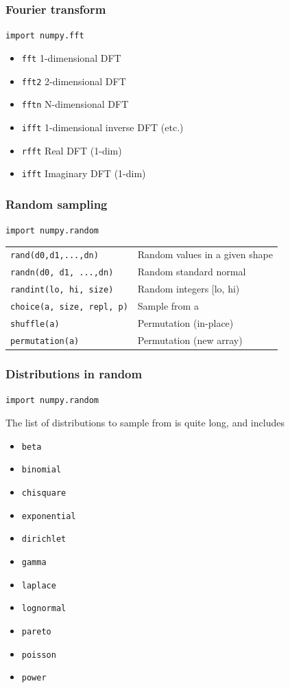 \begin{frame}\frametitle{Fourier transform}

\texttt{import numpy.fft}

\begin{itemize}
    \item \texttt{fft} 1-dimensional DFT
    \item \texttt{fft2} 2-dimensional DFT
    \item \texttt{fftn} N-dimensional DFT
    \item \texttt{ifft} 1-dimensional inverse DFT (etc.)
    \item \texttt{rfft} Real DFT (1-dim)
    \item \texttt{ifft} Imaginary DFT (1-dim)
\end{itemize}

\end{frame}

\begin{frame}\frametitle{Random sampling}

\texttt{import numpy.random}

\begin{table}
\centering
\begin{tabular}{@{}ll@{}}
    \texttt{rand(d0,d1,...,dn)} & Random values in a given shape\\
    \texttt{randn(d0, d1, ...,dn)} & Random standard normal\\
    \texttt{randint(lo, hi, size)} & Random integers [lo, hi)\\
    \texttt{choice(a, size, repl, p)} & Sample from a\\
    \texttt{shuffle(a)} & Permutation (in-place)\\
    \texttt{permutation(a)} & Permutation (new array)
\end{tabular}
\end{table}

\end{frame}

\begin{frame}\frametitle{Distributions in random}
\texttt{import numpy.random}

    The list of distributions to sample from is quite long, and includes
\begin{itemize}
    \item \texttt{beta}
    \item  \texttt{binomial}
    \item \texttt{chisquare}
    \item \texttt{exponential}
    \item \texttt{dirichlet}
    \item \texttt{gamma}
    \item \texttt{laplace}
    \item \texttt{lognormal}
    \item \texttt{pareto}
    \item \texttt{poisson}
    \item \texttt{power}
\end{itemize}


\end{frame}


